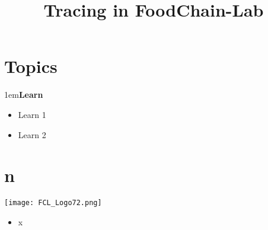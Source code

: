 \documentclass[10pt]{beamer}
\title{Tracing in FoodChain-Lab}
\date{}
\begin{document}
\maketitle

\section{Topics}
\begin{frame}
\leftskip1em\textbf{Learn}
	\begin{itemize}
		\item Learn 1
		\item Learn 2
	\end{itemize}
\end{frame}

\section{n}
\begin{frame}
	\begin{center}
			\texttt{[image: FCL\_Logo72.png]}
	\end{center}
	\begin{itemize}
		\item x
	\end{itemize}
\end{frame}
\end{document}
